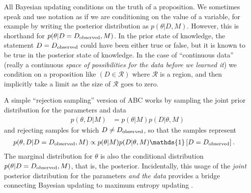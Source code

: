 \documentclass[article]{jss}
\begin{document}
All Bayesian updating conditions on the truth of a proposition. We sometimes
speak and use notation as if we are conditioning on the value of a variable, for
example by writing the posterior distribution as
$p(\theta | D, M)$. However,
this is shorthand for $p(\theta | D = D_{\rm observed}, M)$.
In the prior state of knowledge, the statement
$D = D_{\rm observed}$ could have been either
true or false, but it is known to be true
in the posterior state of knowledge.
In the case of ``continuous data'' (really a continuous {\it space of
possibilities for the data before we learned it}) we condition on a
proposition like $(D \in \mathcal{R})$ where $\mathcal{R}$ is a region, and
then implicitly take a limit as the size of $\mathcal{R}$ goes to zero.

A simple ``rejection sampling'' version of
ABC works by sampling the joint prior distribution for the parameters and
data
\begin{align*}
p(\theta, D | M) &= p(\theta | M)p(D | \theta, M)
\end{align*}
and rejecting samples for which $D \neq D_{\rm observed}$, so that the
samples represent
\begin{align}
p(\theta, D | D = D_{\rm observed}, M) &\propto p(\theta | M)p(D | \theta, M)
\mathds{1}\left[D = D_{\rm observed}\right].\label{eqn:abc_posterior}
\end{align}
The marginal distribution for $\theta$ is also the conditional distribution
$p(\theta | D = D_{\rm observed}, M)$, that is,
the posterior. Incidentally, this usage of the {\em joint} posterior
distribution for the parameters {\em and the data} provides a bridge
connecting Bayesian updating to maximum entropy updating
\citep{caticha2006updating,giffin2007updating}.
\end{document}

